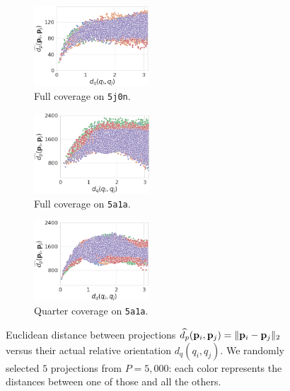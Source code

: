 \begin{figure}
    \begin{subfigure}[t]{0.31\textwidth}
        \centering
        \includegraphics[height=3cm]{figures/dPdQ_5j0n_euclidean3.png}
        \caption{Full coverage on \texttt{5j0n}.}%
        \label{fig:euclidean-not-robust:5j0n-full}
    \end{subfigure}
    \hfill
    \begin{subfigure}[t]{0.31\textwidth}
        \centering
        \includegraphics[height=3cm]{figures/dPdQ_5a1a_full_euclidean3.png}
        \caption{Full coverage on \texttt{5a1a}.}%
        \label{fig:euclidean-not-robust:5a1a-full}
    \end{subfigure}
    \hfill
    \begin{subfigure}[t]{0.31\textwidth}
        \centering
        \includegraphics[height=3cm]{figures/dPdQ_5a1a_euclidean3.png}
        \caption{Quarter coverage on \texttt{5a1a}.}%
        \label{fig:euclidean-not-robust:5a1a-quarter}
    \end{subfigure}
    \caption{%
        Euclidean distance between projections $\widehat{d_p}(\mathbf{p}_i, \mathbf{p}_j) = \| \mathbf{p}_i - \mathbf{p}_j \|_2$ versus their actual relative orientation $d_q(q_i, q_j)$.
        We randomly selected $5$ projections from $P = 5,000$: each color represents the distances between one of those and all the others.
    }\label{fig:euclidean-not-robust}
\end{figure}


